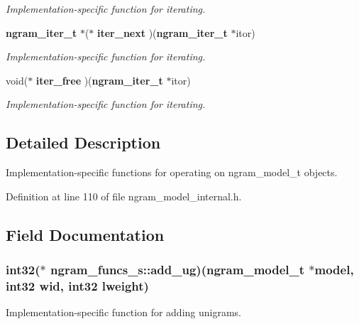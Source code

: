 \begin{CompactItemize}
\begin{CompactList}\small\item\em Implementation-specific function for iterating. \item\end{CompactList}\item 
{\bf ngram\_\-iter\_\-t} $\ast$($\ast$ {\bf iter\_\-next} )({\bf ngram\_\-iter\_\-t} $\ast$itor)\label{structngram__funcs__s_57777056985f8adc3494e859c1102f3e}

\begin{CompactList}\small\item\em Implementation-specific function for iterating. \item\end{CompactList}\item 
void($\ast$ {\bf iter\_\-free} )({\bf ngram\_\-iter\_\-t} $\ast$itor)\label{structngram__funcs__s_d7031e996c16516cf7f52e7a4adee4bb}

\begin{CompactList}\small\item\em Implementation-specific function for iterating. \item\end{CompactList}\end{CompactItemize}


\subsection{Detailed Description}
Implementation-specific functions for operating on ngram\_\-model\_\-t objects. 

Definition at line 110 of file ngram\_\-model\_\-internal.h.

\subsection{Field Documentation}
\subsubsection[{add\_\-ug}]{\setlength{\rightskip}{0pt plus 5cm}int32($\ast$ {\bf ngram\_\-funcs\_\-s::add\_\-ug})({\bf ngram\_\-model\_\-t} $\ast$model, int32 wid, int32 lweight)}\label{structngram__funcs__s_6d553c95c7f4da4993f2b9df757ac016}


Implementation-specific function for adding unigrams. 

